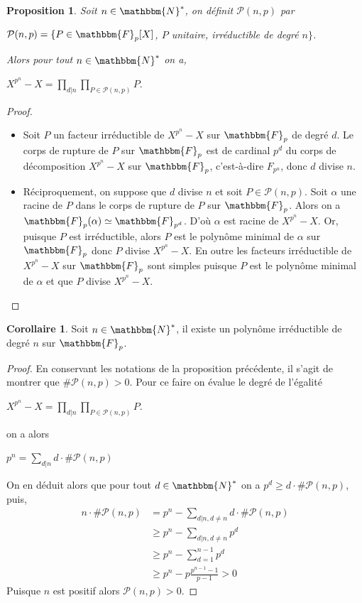 \documentclass[12pt]{article}
\newcommand{\N}{\mathbbm{N}}
\newcommand{\F}{\mathbbm{F}}
\newtheorem{prop}{Proposition}
\theoremstyle{definition}
\newtheorem{coro}{Corollaire}
\begin{document}
\begin{prop}
Soit $n \in \N^{*}$, on définit $\mathcal{P} (n,p)$ par
\begin{center}
$\mathcal{P} (n,p) = \{ P \in \F_p [X]$, $P$ unitaire, irréductible de degré $n \}$.
\end{center}
Alors pour tout $n \in \N^{*}$ on a,
\begin{center}
$\displaystyle X^{p^n} - X = \prod_{d | n} \prod_{P \in \mathcal{P}(n,p)} P.$
\end{center}
\end{prop}
\begin{proof}
\begin{itemize}
\item Soit $P$ un facteur irréductible de $X^{p^n} - X$ sur $\F_p$ de degré $d$. Le corps de rupture de $P$ sur $\F_p$ est de cardinal $p^d$ du corps de décomposition $X^{p^n} - X$ sur $\F_p$, c'est-à-dire $F_{p^n}$, donc $d$ divise $n$.
\item Réciproquement, on suppose que $d$ divise $n$ et soit $P \in \mathcal{P} (n,p)$. Soit $\alpha$ une racine de $P$ dans le corps de rupture de $P$ sur $\F_p$. Alors on a $\F_p (\alpha) \simeq \F_{p^d}$. D'où $\alpha$ est racine de $X^{p^n} - X$. Or, puisque $P$ est irréductible, alors $P$ est le polynôme minimal de $\alpha$ sur $\F_p$ donc $P$ divise $X^{p^n} - X$. En outre les facteurs irréductible de $X^{p^n} - X$ sur $\F_p$ sont simples puisque $P$ est le polynôme minimal de $\alpha$ et que $P$ divise $X^{p^n} - X$.
\end{itemize}
\end{proof}
\begin{coro}
Soit $n \in \N^{*}$, il existe un polynôme irréductible de degré $n$ sur $\F_p$.
\end{coro}
\begin{proof}
En conservant les notations de la proposition précédente, il s'agit de montrer que $\# \mathcal{P} (n,p) > 0$. Pour ce faire on évalue le degré de l'égalité
\begin{center}
$\displaystyle X^{p^n} - X = \prod_{d | n} \prod_{P \in \mathcal{P}(n,p)} P.$
\end{center}
on a alors
\begin{center}
$\displaystyle p^n = \sum_{d | n} d \cdot \# \mathcal{P} (n,p)$
\end{center}
On en déduit alors que pour tout $d \in \N^{*}$ on a $p^d \geq d \cdot \# \mathcal{P} (n,p)$, puis,
\begin{align*}
\displaystyle
n \cdot \# \mathcal{P} (n,p) &= p^n - \sum_{d | n , d \neq n} d \cdot \# \mathcal{P} (n,p)\\
&\geq p^n - \sum_{d | n , d \neq n} p^d\\
&\geq p^n - \sum_{d =1}^{n-1} p^d\\
&\geq p^n - p \frac{p^{n-1} - 1}{p-1} > 0
\end{align*}
Puisque $n$ est positif alors $\mathcal{P} (n,p) > 0$.
\end{proof}
\end{document}
